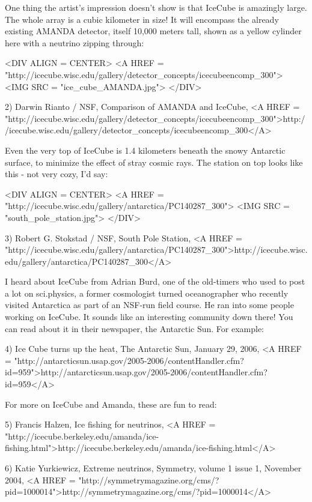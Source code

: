 One thing the artist's impression doesn't show is that 
IceCube is amazingly large.  The whole
array is a cubic kilometer in size!  It will encompass the already
existing AMANDA detector, itself 10,000 meters
tall, shown as a yellow cylinder here with
a neutrino zipping through:

<DIV ALIGN = CENTER>
<A HREF = 
"http://icecube.wisc.edu/gallery/detector_concepts/icecubeencomp_300">
<IMG SRC = "ice_cube_AMANDA.jpg">
</DIV>

2) Darwin Rianto / NSF, Comparison of AMANDA and IceCube, 
<A HREF = "http://icecube.wisc.edu/gallery/detector_concepts/icecubeencomp_300">http://icecube.wisc.edu/gallery/detector_concepts/icecubeencomp_300</A>

Even the very top of IceCube is 1.4 kilometers beneath the snowy 
Antarctic surface, to minimize the effect of stray cosmic rays.  
The station on top looks like this - not very cozy, I'd say:

<DIV ALIGN = CENTER>
<A HREF = 
"http://icecube.wisc.edu/gallery/antarctica/PC140287_300">
<IMG SRC = "south_pole_station.jpg">
</DIV>

3) Robert G. Stokstad / NSF, South Pole Station, 
<A HREF = "http://icecube.wisc.edu/gallery/antarctica/PC140287_300">http://icecube.wisc.edu/gallery/antarctica/PC140287_300</A>

I heard about IceCube from Adrian Burd, one of the old-timers 
who used to post a lot on sci.physics, a former cosmologist turned
oceanographer who recently visited Antarctica as part of an 
NSF-run field course.  He ran into some people working on IceCube. 
It sounds like an interesting community down there!  You can read 
about it in their newspaper, the Antarctic Sun.  For example:

4) Ice Cube turns up the heat, The Antarctic Sun, January 29, 2006,
<A HREF = "http://antarcticsun.usap.gov/2005-2006/contentHandler.cfm?id=959">http://antarcticsun.usap.gov/2005-2006/contentHandler.cfm?id=959</A>

For more on IceCube and Amanda, these are fun to read:

5) Francis Halzen, Ice fishing for neutrinos, 
<A HREF = "http://icecube.berkeley.edu/amanda/ice-fishing.html">http://icecube.berkeley.edu/amanda/ice-fishing.html</A>

6) Katie Yurkiewicz, Extreme neutrinos, Symmetry, volume 1 issue 1, 
November 2004, <A HREF = "http://symmetrymagazine.org/cms/?pid=1000014">http://symmetrymagazine.org/cms/?pid=1000014</A>

